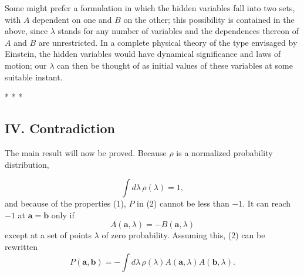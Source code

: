 Some might prefer a formulation in which the hidden variables fall into two sets, with $A$ dependent on
one and $B$ on the other; this possibility is contained in the above, since $\lambda$ stands for any number of variables
and the dependences thereon of $A$ and $B$ are unrestricted. In a complete physical theory of the
type envisaged by Einstein, the hidden variables would have dynamical significance and laws of motion;
our $\lambda$ can then be thought of as initial values of these variables at some suitable instant.\\
\centerline{* * *}
%
\subsection*{IV. Contradiction}

The main result will now be proved. Because $\rho$ is a normalized probability distribution,

\setcounter{equation}{11}

\begin{equation}
\int d\lambda\, \rho(\lambda) = 1,
\end{equation}
and because of the properties (1), $P$ in (2) cannot be less than $-1$. It can reach $-1$ at $\pmb{a} = \pmb{b}$ only if
\begin{equation}
A(\pmb{a}, \lambda) = - B(\pmb{a}, \lambda)
\end{equation}
except at a set of points $\lambda$ of zero probability. Assuming this, (2) can be rewritten
\begin{equation}
P(\pmb{a}, \pmb{b}) = - \int d\lambda\, \rho(\lambda) A(\pmb{a}, \lambda) A(\pmb{b}, \lambda).
\end{equation}

